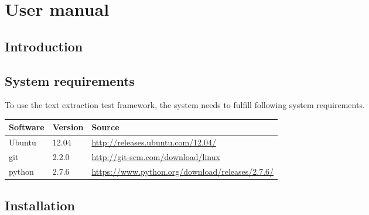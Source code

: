 
\chapter{User manual} %

\label{User manual} %



\section{Introduction}


\section{System requirements}

To use the text extraction test framework, the system needs to fulfill following system requirements.

\begin{tabular}{| p{2cm} | p{1.5cm} | p{9.5cm} |} 
	\hline
	\textbf{Software} & \textbf{Version} & \textbf{Source} \\ \hline
	Ubuntu & 12.04 & \url{http://releases.ubuntu.com/12.04/} \\ \hline
	git & 2.2.0 & \url{http://git-scm.com/download/linux} \\ \hline
	python & 2.7.6 & \url{https://www.python.org/download/releases/2.7.6/} \\ \hline
\end{tabular}


\section{Installation}

